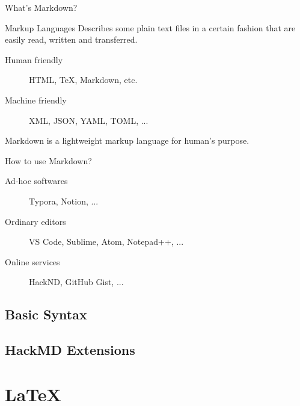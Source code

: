 \documentclass[mathserif]{beamer}
\begin{document}
\begin{frame}{What's Markdown?}{}

\begin{block}{Markup Languages}
Describes some plain text files in a certain fashion that are easily read, written and transferred.

\begin{description}
\item[Human friendly] HTML, \TeX, Markdown, etc.
\item[Machine friendly] XML, JSON, YAML, TOML, ...
\end{description}
\end{block}

Markdown is a lightweight markup language for human's purpose.

\end{frame}

\begin{frame}{How to use Markdown?}{}

\begin{description}
\item[Ad-hoc softwares] Typora, Notion, ...
\item[Ordinary editors] VS Code, Sublime, Atom, Notepad++, ...
\item[Online services] HackND, GitHub Gist, ...
\end{description}

\end{frame}

\subsection{Basic Syntax}


\subsection{HackMD Extensions}


\section{\LaTeX}
\end{document}
